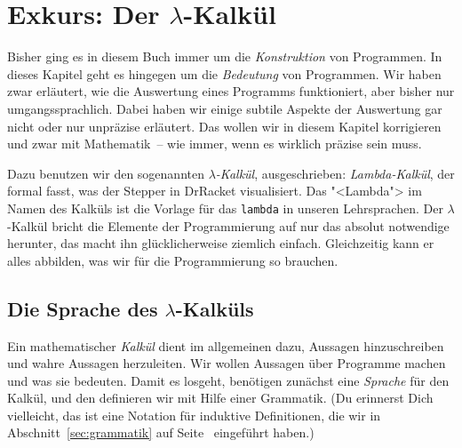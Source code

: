 
\chapter{Exkurs: Der $\lambda$-Kalkül}
\label{chap:lambda}

\newcommand{\lrm}{\mathrm}


Bisher ging es in diesem Buch immer um die \emph{Konstruktion} von
Programmen.  In dieses Kapitel geht es hingegen um die
\textit{Bedeutung} von Programmen.  Wir haben zwar erläutert, wie die
Auswertung eines Programms funktioniert, aber bisher nur
umgangssprachlich.  Dabei haben wir einige subtile Aspekte der
Auswertung gar nicht oder nur unpräzise erläutert.  Das wollen wir in
diesem Kapitel korrigieren und zwar mit Mathematik~-- wie immer, wenn
es wirklich präzise sein muss.

Dazu benutzen wir den sogenannten \textit{$\lambda$-Kalkül},
ausgeschrieben: \textit{Lambda-Kalkül}, der formal fasst, was der
Stepper in DrRacket visualisiert.  Das "<Lambda"> im Namen des Kalküls
ist die Vorlage für das \lstinline{lambda} in unseren Lehrsprachen.
Der $\lambda$-Kalkül bricht die Elemente der Programmierung auf nur
das absolut notwendige herunter, das macht ihn glücklicherweise
ziemlich einfach.  Gleichzeitig kann er alles abbilden, was wir für
die Programmierung so brauchen.

\section{Die Sprache des $\lambda$-Kalküls}
\label{sec:sprache}

Ein mathematischer \textit{Kalkül} dient im allgemeinen
dazu, Aussagen hinzuschreiben und wahre Aussagen herzuleiten.  Wir
wollen Aussagen über Programme machen und was sie bedeuten.  Damit es
losgeht, benötigen zunächst eine \textit{Sprache} für den Kalkül, und
den definieren wir mit Hilfe einer Grammatik.  (Du erinnerst Dich
vielleicht, das ist eine Notation für induktive Definitionen, die wir
in Abschnitt~\ref{sec:grammatik} auf Seite~\pageref{sec:grammatik}
eingeführt haben.)

